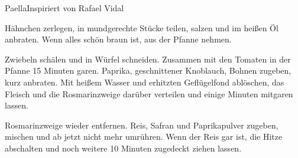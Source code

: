 \begin{recipe}{Paella}{Inspiriert von Rafael Vidal}
  \label{Paella}
  \inglist

  \steps

  Hähnchen zerlegen, in mundgerechte Stücke teilen, salzen und im heißen Öl
  anbraten. Wenn alles schön braun ist, aus der Pfanne nehmen.

  Zwiebeln schälen und in Würfel schneiden. Zusammen mit den Tomaten in der
  Pfanne 15 Minuten garen. Paprika, geschnittener Knoblauch, Bohnen zugeben,
  kurz anbraten. Mit heißem Wasser und erhitzten Geflügelfond ablöschen, das
  Fleisch und die Rosmarinzweige darüber verteilen und einige Minuten
  mitgaren lassen.

  Rosmarinzweige wieder entfernen. Reis, Safran und Paprikapulver zugeben,
  mischen und ab jetzt nicht mehr umrühren. Wenn der Reis gar ist, die Hitze
  abschalten und noch weitere 10 Minuten zugedeckt ziehen lassen.

\end{recipe}


